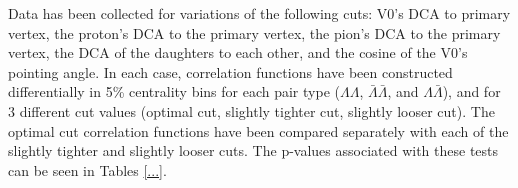 

Data has been collected for variations of the following cuts: V0's DCA to primary vertex, the proton's DCA to the primary vertex, the pion's DCA to the primary vertex, the DCA of the daughters to each other, and the cosine of the V0's pointing angle.  In each case, correlation functions have been constructed differentially in 5\% centrality bins for each pair type ($\Lambda\Lambda$, $\bar{\Lambda}\bar{\Lambda}$, and $\Lambda\bar{\Lambda}$), and for 3 different cut values (optimal cut, slightly tighter cut, slightly looser cut).  The optimal cut correlation functions have been compared separately with each of the slightly tighter and slightly looser cuts.  The p-values associated with these tests can be seen in Tables \ref{...}.

